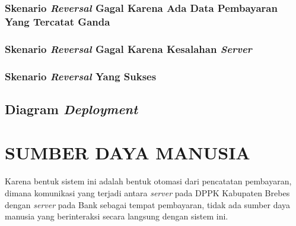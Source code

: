 \documentclass[pdftex,12pt, oneside]{article}
\begin{document}
\subsubsection{Skenario \textit{Reversal} Gagal Karena Ada Data Pembayaran Yang Tercatat Ganda}
\subsubsection{Skenario \textit{Reversal} Gagal Karena Kesalahan \textit{Server}}
\subsubsection{Skenario \textit{Reversal} Yang Sukses}

\subsection{Diagram \textit{Deployment}}

\section{SUMBER DAYA MANUSIA}

Karena bentuk sistem ini adalah bentuk otomasi dari pencatatan pembayaran, dimana komunikasi yang terjadi antara \textit{server} pada DPPK Kabupaten Brebes dengan \textit{server} pada Bank sebagai tempat pembayaran, tidak ada sumber daya manusia yang berinteraksi secara langsung dengan sistem ini.
\end{document}
